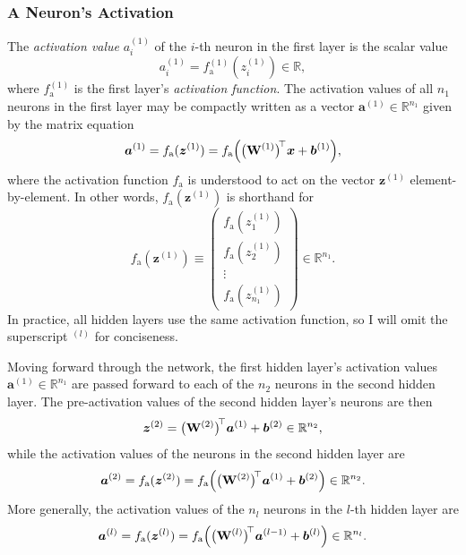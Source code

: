 \documentclass[11pt, a4paper]{article}
\renewcommand{\vec}[1]{\bm{#1}}
\newcommand{\mat}[1]{\mathbf{#1}}
\newcommand{\W}{\mat{W}}
\newcommand{\x}{\vec{x}}
\renewcommand{\b}{\vec{b}}
\newcommand{\z}{\vec{z}}
\renewcommand{\a}{\vec{a}}
\begin{document}
\subsubsection{A Neuron's Activation}
The \textit{activation value} $ a_{i}^{(1)} $ of the $ i $-th neuron in the first layer is the scalar value
\begin{equation*}
    a_{i}^{(1)} = f_{\text{a}}^{(1)}(z_{i}^{(1)}) \in \mathbb{R},
\end{equation*}
where $ f_{\text{a}}^{(1)} $ is the first layer's \textit{activation function}.
The activation values of all $ n_{1} $ neurons in the first layer may be compactly written as a vector $ \a^{(1)} \in \mathbb{R}^{n_{1}} $ given by the matrix equation
\begin{equation*}
    \a^{(1)} = f_{\text{a}}(\z^{(1)}) = f_{\text{a}} \Big(\big( \W^{(1)} \big)^{\mspace{-4mu}\top}\x + \b^{(1)}\Big),
\end{equation*}
where the activation function $ f_{\text{a}} $ is understood to act on the vector $ \z^{(1)} $ element-by-element.
In other words, $ f_{\text{a}} (\z^{(1)}) $ is shorthand for
\begin{equation*}
    f_{\text{a}} (\z^{(1)}) \equiv
    \begin{pmatrix}
        f_{\text{a}}(z_{1}^{(1)})\\[1mm]
        f_{\text{a}}(z_{2}^{(1)})\\
        \vdots\\[0.5mm]
        f_{\text{a}}(z_{n_{1}}^{(1)})
    \end{pmatrix}
    \in \mathbb{R}^{n_{1}}.
\end{equation*}
In practice, all hidden layers use the same activation function, so I will omit the superscript $ {}^{(l)} $ for conciseness.

Moving forward through the network, the first hidden layer's activation values $ \a^{(1)} \in \mathbb{R}^{n_{1}} $ are passed forward to each of the $ n_{2} $ neurons in the second hidden layer.
The pre-activation values of the second hidden layer's neurons are then
\begin{equation*}
    \z^{(2)} = \big( \W^{(2)} \big)^{\mspace{-4mu}\top} \a^{(1)} + \b^{(2)} \in \mathbb{R}^{n_{2}},
\end{equation*}
while the activation values of the neurons in the second hidden layer are
\begin{equation*}
    \a^{(2)} = f_{\text{a}}(\z^{(2)}) = f_{\text{a}} \Big( \big( \W^{(2)} \big)^{\mspace{-4mu}\top} \a^{(1)} + \b^{(2)}\Big) \in \mathbb{R}^{n_{2}}.
\end{equation*}
More generally, the activation values of the $ n_{l} $ neurons in the $ l $-th hidden layer are
\begin{equation*}
    \a^{(l)} = f_{\text{a}}(\z^{(l)}) = f_{\text{a}} \Big( \big( \W^{(l)} \big)^{\mspace{-4mu}\top} \a^{(l-1)} + \b^{(l)}\Big) \in \mathbb{R}^{n_{l}}.
\end{equation*}
\end{document}
